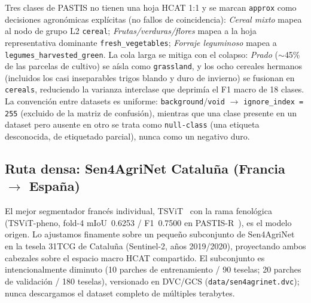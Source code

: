 Tres clases de PASTIS no tienen una hoja HCAT 1:1 y se marcan
\texttt{approx} como decisiones agronómicas explícitas (no fallos de
coincidencia): \emph{Cereal mixto} mapea al nodo de grupo L2
\texttt{cereal}; \emph{Frutas/verduras/flores} mapea a la hoja
representativa dominante \texttt{fresh\_vegetables}; \emph{Forraje
leguminoso} mapea a \texttt{legumes\_harvested\_green}. La cola larga se
mitiga con el colapso: \emph{Prado} ($\sim$45\% de las parcelas de
cultivo) se aísla como \texttt{grassland}, y los ocho cereales hermanos
(incluidos los casi inseparables trigos blando y duro de invierno) se
fusionan en \texttt{cereals}, reduciendo la varianza interclase que
deprimía el F1 macro de 18 clases. La convención entre datasets es
uniforme: \texttt{background}/\texttt{void} $\rightarrow$
\texttt{ignore\_index = 255} (excluido de la matriz de confusión),
mientras que una clase presente en un dataset pero ausente en otro se
trata como \texttt{null-class} (una etiqueta desconocida, de etiquetado
parcial), nunca como un negativo duro.

\subsection{Ruta densa: Sen4AgriNet Cataluña (Francia $\rightarrow$ España)}
\label{sec:multiregion:dense}

El mejor segmentador francés individual, TSViT~\cite{tarasiou2023tsvit}
con la rama fenológica (TSViT-pheno, fold-4 mIoU~0.6253 / F1~0.7500 en
PASTIS-R~\cite{garnot2021pastis}), es el modelo origen. Lo ajustamos
finamente sobre un pequeño subconjunto de
Sen4AgriNet~\cite{sykas2022sen4agrinet} en la tesela 31TCG de Cataluña
(Sentinel-2, años 2019/2020),
proyectando ambos cabezales sobre el espacio macro HCAT compartido. El
subconjunto es intencionalmente diminuto (10 parches de entrenamiento /
90 teselas; 20 parches de validación / 180 teselas), versionado en
DVC/GCS (\texttt{data/sen4agrinet.dvc}); nunca descargamos el dataset
completo de múltiples terabytes.

